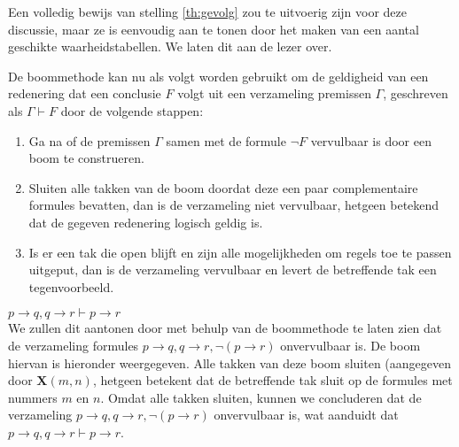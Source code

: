 Een volledig bewijs van stelling \ref{th:gevolg} zou te uitvoerig zijn voor deze discussie, maar ze is eenvoudig aan te tonen door het maken van een aantal geschikte waarheidstabellen. We laten dit aan de lezer over.

De boommethode kan nu als volgt worden gebruikt om de geldigheid van een redenering dat een conclusie $F$ volgt uit een verzameling premissen $\Gamma$, geschreven als $\Gamma\vdash F$ door de volgende stappen:
\begin{enumerate}
\item Ga na of de premissen $\Gamma$ samen met de formule $\neg F$ vervulbaar is door een boom te construeren.
\item Sluiten alle takken van de boom doordat deze een paar complementaire formules bevatten, dan is de verzameling niet vervulbaar, hetgeen betekend dat de gegeven redenering logisch geldig is.
\item Is er een tak die open blijft en zijn alle mogelijkheden om regels toe te passen uitgeput, dan is de verzameling vervulbaar en levert de betreffende tak een tegenvoorbeeld.
\end{enumerate}

\begin{example} $p\rightarrow q,q\rightarrow r\vdash p\rightarrow r$\\
We zullen dit aantonen door met behulp van de boommethode te laten zien dat de verzameling formules $p\rightarrow q, q\rightarrow r, \neg(p\rightarrow r)$ onvervulbaar is. De boom hiervan is hieronder weergegeven. Alle takken van deze boom sluiten (aangegeven door $\mathbf{X}(m,n)$, hetgeen betekent dat de betreffende tak sluit op de formules met nummers $m$ en $n$. Omdat alle takken sluiten, kunnen we concluderen dat de verzameling $p\rightarrow q,q\rightarrow r, \neg(p\rightarrow r)$ onvervulbaar is, wat aanduidt dat $p\rightarrow q,q\rightarrow r\vdash p\rightarrow r$.
\begin{center}
\end{center}
\end{example}

